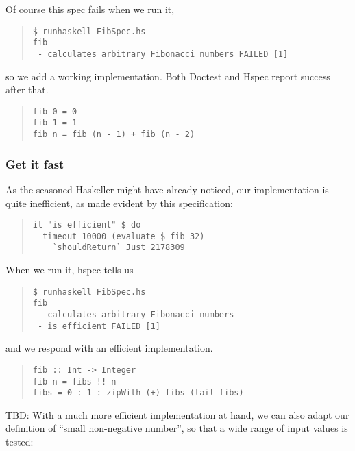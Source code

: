 \documentclass[preprint]{sigplanconf}
\begin{document}
\noindent Of course this spec fails when we run it,

\begin{quote}
\small
\begin{verbatim}
$ runhaskell FibSpec.hs
fib
 - calculates arbitrary Fibonacci numbers FAILED [1]
\end{verbatim}
\end{quote}

\noindent so we add a working implementation.  Both Doctest and Hspec
report success after that.

\begin{quote}
\small
\begin{verbatim}
fib 0 = 0
fib 1 = 1
fib n = fib (n - 1) + fib (n - 2)
\end{verbatim}
\end{quote}


\subsubsection{Get it fast}

As the seasoned Haskeller might have already noticed, our
implementation is quite inefficient, as made evident by this
specification:

\begin{quote}
\small
\begin{verbatim}
it "is efficient" $ do
  timeout 10000 (evaluate $ fib 32)
    `shouldReturn` Just 2178309
\end{verbatim}
\end{quote}

\noindent When we run it, hspec tells us

\begin{quote}
\small
\begin{verbatim}
$ runhaskell FibSpec.hs
fib
 - calculates arbitrary Fibonacci numbers
 - is efficient FAILED [1]
\end{verbatim}
\end{quote}

\noindent and we respond with an efficient implementation.

\begin{quote}
\small
\begin{verbatim}
fib :: Int -> Integer
fib n = fibs !! n
fibs = 0 : 1 : zipWith (+) fibs (tail fibs)
\end{verbatim}
\end{quote}

\noindent TBD: With a much more efficient implementation at hand, we
can also adapt our definition of ``small non-negative number'', so
that a wide range of input values is tested:
\end{document}

